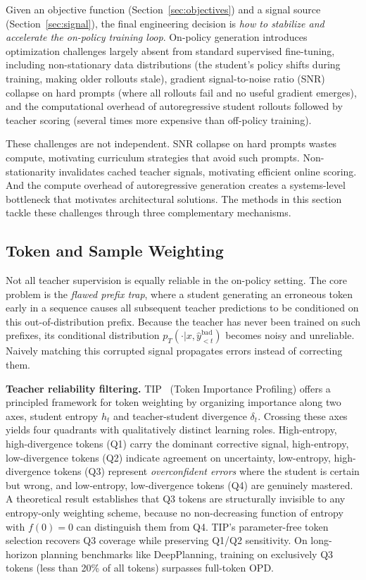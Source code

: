 \documentclass{article} %
\newcommand{\pteacher}{p_T}
\begin{document}
Given an objective function (Section~\ref{sec:objectives}) and a signal source (Section~\ref{sec:signal}), the final engineering decision is \emph{how to stabilize and accelerate the on-policy training loop}. On-policy generation introduces optimization challenges largely absent from standard supervised fine-tuning, including non-stationary data distributions (the student's policy shifts during training, making older rollouts stale), gradient signal-to-noise ratio (SNR) collapse on hard prompts (where all rollouts fail and no useful gradient emerges), and the computational overhead of autoregressive student rollouts followed by teacher scoring (several times more expensive than off-policy training).

These challenges are not independent. SNR collapse on hard prompts wastes compute, motivating curriculum strategies that avoid such prompts. Non-stationarity invalidates cached teacher signals, motivating efficient online scoring. And the compute overhead of autoregressive generation creates a systems-level bottleneck that motivates architectural solutions. The methods in this section tackle these challenges through three complementary mechanisms.

\subsection{Token and Sample Weighting}
\label{subsec:weighting}

Not all teacher supervision is equally reliable in the on-policy setting. The core problem is the \emph{flawed prefix trap}, where a student generating an erroneous token early in a sequence causes all subsequent teacher predictions to be conditioned on this out-of-distribution prefix. Because the teacher has never been trained on such prefixes, its conditional distribution $\pteacher(\cdot|x, \hat{y}_{<t}^{\text{bad}})$ becomes noisy and unreliable. Naively matching this corrupted signal propagates errors instead of correcting them.

\textbf{Teacher reliability filtering.} TIP~\citep{2604.14084} (Token Importance Profiling) offers a principled framework for token weighting by organizing importance along two axes, student entropy $h_t$ and teacher-student divergence $\delta_t$. Crossing these axes yields four quadrants with qualitatively distinct learning roles. High-entropy, high-divergence tokens (Q1) carry the dominant corrective signal, high-entropy, low-divergence tokens (Q2) indicate agreement on uncertainty, low-entropy, high-divergence tokens (Q3) represent \emph{overconfident errors} where the student is certain but wrong, and low-entropy, low-divergence tokens (Q4) are genuinely mastered. A theoretical result establishes that Q3 tokens are structurally invisible to any entropy-only weighting scheme, because no non-decreasing function of entropy with $f(0)=0$ can distinguish them from Q4. TIP's parameter-free token selection recovers Q3 coverage while preserving Q1/Q2 sensitivity. On long-horizon planning benchmarks like DeepPlanning, training on exclusively Q3 tokens (less than 20\% of all tokens) surpasses full-token OPD.
\end{document}
